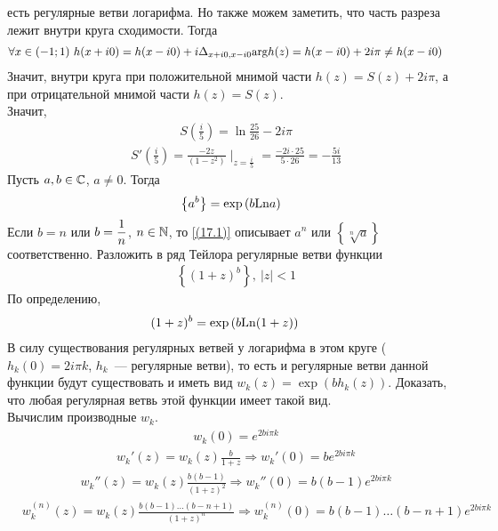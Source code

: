 есть регулярные ветви логарифма. Но также можем заметить, что часть разреза
лежит внутри круга сходимости. Тогда
\begin{align*}
  & \forall x \in (-1;1) \ h(x + i0) = h(x-i0) + i\Delta_{x+i0, x-i0}\mathrm{arg} h(z) = h(x-i0) + 2 i \pi \neq h(x-i0)
\end{align*}
Значит, внутри круга при положительной мнимой части $h(z) = S(z) + 2 i \pi$, а
при отрицательной мнимой части $h(z) = S(z)$.
\\
Значит,
\begin{align*}
  & S\left( \frac{i}{5} \right) = \ln \frac{25}{26} - 2 i \pi
\end{align*}
\begin{align*}
  & S'\left( \frac{i}{5} \right) = \frac{-2z}{(1-z^2)}\mid_{z=\frac{i}{5}} = \frac{-2i\cdot 25}{5\cdot 26} = -\frac{5i}{13}
\end{align*}
\Def
Пусть $a, b \in \mathbb{C}$, $a \neq 0$. Тогда
\begin{equation}\label{(17.1)}
    \left\{ a^b \right\} = \exp\left( b \mathrm{Ln} a\right)
\end{equation}
\Exse
Если $b = n$ или $b = \displaystyle \frac{1}{n}$, $n\in \mathbb{N}$, то \eqref{(17.1)} описывает
$a^n$ или $\left\{ \sqrt[n]{a} \right\}$ соответственно.
\Example
Разложить в ряд Тейлора регулярные ветви функции
\begin{align*}
  & \left\{ (1+z)^b \right\}, \ \left| z \right|<1
\end{align*}
\nonum
По определению,
\begin{align*}
  & (1+z)^b = \exp \left( b \mathrm{Ln} (1+z) \right)
\end{align*}
В силу существования регулярных ветвей у логарифма в этом круге ($h_k(0) = 2 i
\pi k$, $h_k$~--- регулярные ветви), то есть и регулярные ветви данной функции
будут существовать и иметь вид $w_k(z) = \exp \left( b h_k(z) \right)$.
\Exse
Доказать, что любая регулярная ветвь этой функции имеет такой вид.
\\
Вычислим производные $w_k$.
\begin{align*}
  & w_k(0) = e^{2bi\pi k}
\end{align*}
\begin{align*}
  & w_k'(z) = w_k(z) \frac{b}{1+z} \Rightarrow w_k'(0) = be^{2bi\pi k}
\end{align*}
\begin{align*}
  & w_k''(z) = w_k(z) \frac{b(b-1)}{(1+z)^2} \Rightarrow w_k''(0) = b(b-1)e^{2bi\pi k}
\end{align*}
\begin{align*}
  & w_k^{(n)}(z) = w_k(z) \frac{b(b-1)\dots(b-n+1)}{(1+z)^n} \Rightarrow w_k^{(n)}(0) = b(b-1)\dots(b-n+1)e^{2bi\pi k}
\end{align*}
